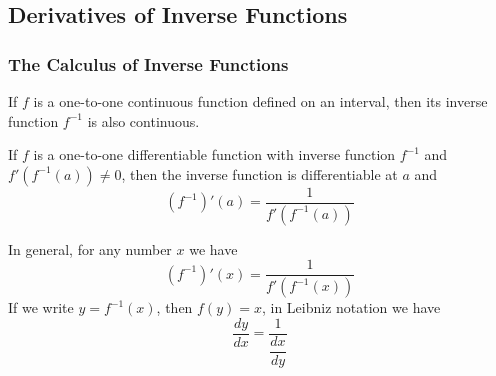 \subsection{Derivatives of Inverse Functions}

\subsubsection*{The Calculus of Inverse Functions}
\begin{theorem}
    If \(f\) is a one-to-one continuous function defined on an interval,
    then its inverse function \(f^{-1}\) is also continuous.
\end{theorem}
\begin{theorem}
    If \(f\) is a one-to-one differentiable function with inverse function
    \(f^{-1}\) and \(f'(f^{-1}(a))\neq 0\), then the inverse function is
    differentiable at \(a\) and
    \[(f^{-1})'(a)=\frac{1}{f'(f^{-1}(a))}\]
\end{theorem}
In general, for any number \(x\) we have
\[(f^{-1})'(x)=\frac{1}{f'(f^{-1}(x))}\]
If we write \(y=f^{-1}(x)\), then \(f(y)=x\), in Leibniz notation we have
\[\frac{dy}{dx}=\frac{1}{\dfrac{dx}{dy}}\]

